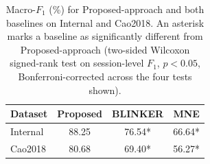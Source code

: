\begin{table}[ht]
  \centering
  \caption{Macro-$F_1$ (\%) for Proposed-approach and both baselines on Internal and Cao2018. An asterisk marks a baseline as significantly different from Proposed-approach (two-sided Wilcoxon signed-rank test on session-level $F_1$, $p<0.05$, Bonferroni-corrected across the four tests shown).}
  \label{tab:f1_significance}
  \begin{tabular}{lccc}
    \toprule
    Dataset & Proposed & BLINKER & MNE \\
    \midrule
    Internal & 88.25 & 76.54* & 66.64* \\
    Cao2018 & 80.68 & 69.40* & 56.27* \\
    \bottomrule
  \end{tabular}
\end{table}
